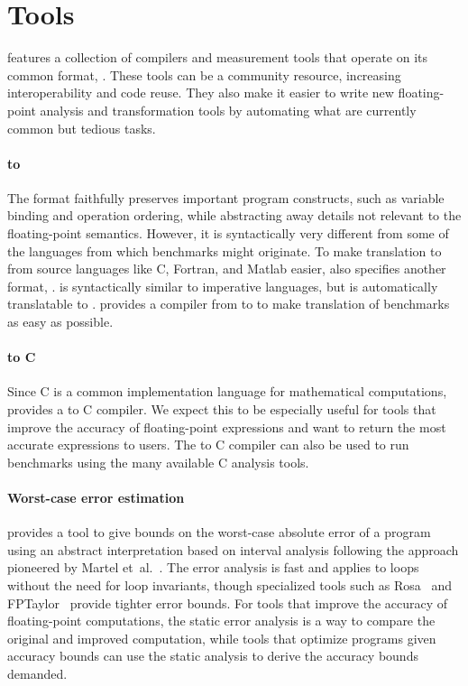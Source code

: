 \documentclass[main.tex]{subfiles}
\begin{document}
\section{Tools}
\label{sec:tools}

\name features
  a collection of compilers and measurement tools
  that operate on its common format, \core.
These tools can be a community resource,
  increasing interoperability and code reuse.
They also make it easier to write
  new floating-point analysis and transformation tools
  by automating what are currently
  common but tedious tasks.

\paragraph{\surface to \core}
The \core format faithfully preserves important program constructs,
  such as variable binding and operation ordering,
  while abstracting away details not relevant
  to the floating-point semantics.
However, it is syntactically very different
  from some of the languages from which benchmarks might originate.
To make translation to \core from source languages
  like C, Fortran, and Matlab easier,
  \name also specifies another format,
  \surface.
\surface is syntactically similar to imperative languages,
  but is automatically translatable to \core.
\name provides a compiler from \surface to \core
  to make translation of benchmarks as easy as possible.

\paragraph{\core to C}
Since C is a common implementation language for mathematical computations,
  \name provides a \core to C compiler.
We expect this to be especially useful for tools
  that improve the accuracy of floating-point expressions
  and want to return the most accurate expressions to users.
The \core to C compiler can also be used
  to run \name benchmarks
  using the many available C analysis tools.

\paragraph{Worst-case error estimation}
\name provides a tool to give bounds on
  the worst-case absolute error of a \core program
  using an abstract interpretation based on interval analysis
  following the approach pioneered by Martel et~al.~\cite{martel-ai}.
The error analysis is fast
  and applies to loops without the need for loop invariants,
  though specialized tools such as Rosa~\cite{DarulovaK14}
  and FPTaylor~\cite{fptaylor-fm15}
  provide tighter error bounds.
For tools that improve the accuracy of floating-point computations,
  the static error analysis is a way to compare
  the original and improved computation,
  while tools that optimize programs given accuracy bounds
  can use the static analysis to derive the accuracy bounds demanded.
\end{document}
